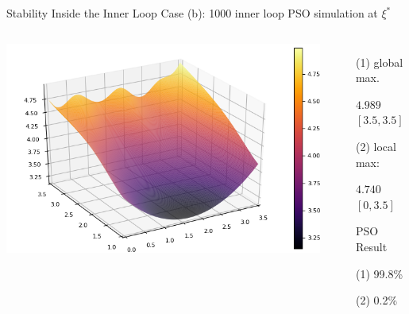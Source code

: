 \documentclass{beamer}
\begin{document}
\begin{frame}{Stability Inside the Inner Loop}
  Case (b): 1000 inner loop PSO simulation at $\xi^*$\\
  \begin{columns}
    \begin{center}
      \includegraphics[scale=0.5]{surfaceb.png}
    \end{center}
    \begin{itemize}
      \item[(1)] global max.
      \item[] $4.989$ $[3.5,3.5]$
      \item[(2)] local max:
      \item[] $4.740$ $[0,3.5]$
      \vspace{5mm}
      \item[] PSO Result
      \item[(1)] 99.8\% 
      \item[(2)] 0.2\%
    \end{itemize}
  \end{columns}
\end{frame}
\end{document}
